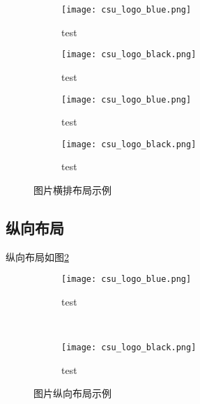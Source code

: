 \begin{figure}[!htb]
    \centering
    \begin{subfigure}[t]{0.24\linewidth}
        \captionsetup{justification=centering}
        \begin{minipage}[b]{1\linewidth}
        \texttt{[image: csu\_logo\_blue.png]}
        \caption{test}
        \end{minipage}
    \end{subfigure}
    \begin{subfigure}[t]{0.24\linewidth}
        \captionsetup{justification=centering}
        \begin{minipage}[b]{1\linewidth}
        \texttt{[image: csu\_logo\_black.png]}
        \caption{test}
        \end{minipage}
    \end{subfigure}
    \begin{subfigure}[t]{0.24\linewidth}
        \captionsetup{justification=centering}
        \begin{minipage}[b]{1\linewidth}
        \texttt{[image: csu\_logo\_blue.png]}
        \caption{test}
        \end{minipage}
    \end{subfigure}
    \begin{subfigure}[t]{0.24\linewidth}
        \captionsetup{justification=centering}
        \begin{minipage}[b]{1\linewidth}
        \texttt{[image: csu\_logo\_black.png]}
        \caption{test}
        \end{minipage}
    \end{subfigure}
    \caption{图片横排布局示例}
    \label{f.row}
\end{figure}

\subsection{纵向布局}

纵向布局如图\ref{f.col}

\begin{figure}[!htb]
    \centering
    \begin{subfigure}[t]{0.15\linewidth}
        \captionsetup{justification=centering} %
        \begin{minipage}[b]{1\linewidth}
        \texttt{[image: csu\_logo\_blue.png]}
        \caption{test}
        \end{minipage}
    \end{subfigure}\\
    \begin{subfigure}[t]{0.15\linewidth}
        \captionsetup{justification=centering} %
        \begin{minipage}[b]{1\linewidth}
        \texttt{[image: csu\_logo\_black.png]}
        \caption{test}
        \end{minipage}
    \end{subfigure}
    \caption{图片纵向布局示例}
    \label{f.col}
\end{figure}

